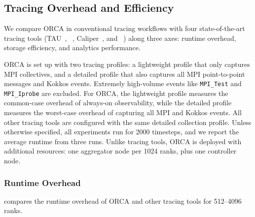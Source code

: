 \subsection{Tracing Overhead and Efficiency}
\label{sec:orca:eval-trace}


We compare ORCA in conventional tracing workflows with four state-of-the-art tracing tools
(TAU~\cite{Shend2006:TAU}, \scorep{}~\cite{Knupf2012:Score-P}, Caliper~\cite{Boehm2016:Caliper},
and \dftracer{}~\cite{Devar2024:DFTracer}) along three axes: runtime overhead, storage efficiency,
and analytics performance.

ORCA is set up with two tracing profiles: a lightweight profile that only captures MPI collectives,
and a detailed profile that also captures all MPI point-to-point messages and Kokkos events.
Extremely high-volume events like \texttt{MPI\_Test} and \texttt{MPI\_Iprobe} are excluded.
For ORCA, the lightweight profile measures the common-case overhead of always-on observability,
while the detailed profile measures the worst-case overhead of capturing all MPI and Kokkos events.
All other tracing tools are configured with the same detailed collection profile.
Unless otherwise specified, all experiments run for 2000 timesteps, and we report the average
runtime from three runs.
Unlike tracing tools, ORCA is deployed with additional resources: one aggregator node per 1024
ranks, plus one controller node.


\subsubsection{Runtime Overhead}\label{sec:orca:eval-trace-runtime}
 compares the runtime overhead of ORCA and other tracing tools for
512--4096 ranks.


